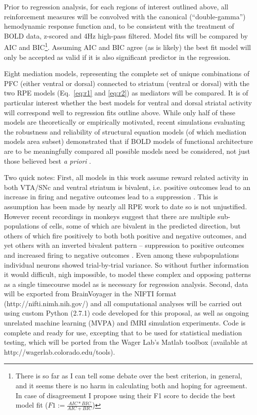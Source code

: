 \documentclass[doc,12pt]{apa}        %
\begin{document}
Prior to regression analysis, for each regions of interest outlined above, all reinforcement measures will be convolved with the canonical (``double-gamma'') hemodynamic response function and, to be consistent with the treatment of BOLD data, z-scored and 4Hz high-pass filtered.  Model fits will be compared by AIC and BIC\footnote{There is so far as I can tell some debate over the best criterion, in general, and it seems there is no harm in calculating both and hoping for agreement.  In case of disagreement I propose using their F1 score to decide the best model fit ($F1 := \frac{AIC*BIC}{AIC+BIC}$) }. Assuming AIC and BIC agree (as is likely) the best fit model will only be accepted as valid if it is also significant predictor in the regression.

Eight mediation models, representing the complete set of unique combinations of PFC (either ventral or dorsal) connected to striatum (ventral or dorsal) with the two RPE models (Eq.~\ref{eq:r1} and \ref{eq:r2}) as mediators will be compared.   It is of particular interest whether the best models for ventral and dorsal striatal activity will correspond well to regression fits outline above. While only half of these models are theoretically or empirically motivated, recent simulations evaluating the robustness and reliability of structural equation models (of which mediation models area subset) demonstrated that if BOLD models of functional architecture are to be meaningfully compared all possible models need be considered, not just those believed best \emph{a priori} \cite{Lohmann:2011p8418}.

Two quick notes: First, all models in this work assume reward related activity in both VTA/SNc and ventral striatum is bivalent, i.e. positive outcomes lead to an increase in firing and negative outcomes lead to a suppression \cite{DArdenne:2008p1505,Cooper:2008p5238,Menon:2007p6529}.  This is assumption has been made by nearly all RPE work to date so is not unjustified.  However recent recordings in monkeys suggest that there are multiple sub-populations of cells, some of which are bivalent in the predicted direction, but others of which fire positively to both both positive and negative outcomes, and yet others with an inverted bivalent pattern -- suppression to positive outcomes and increased firing to negative outcomes \cite{Matsumoto:2009p7219,Levita:2009p7280}.  Even among these subpopulations individual neurons showed trial-by-trial variance.  So without further information it would difficult, nigh impossible, to model these complex and opposing patterns as a single timecourse model as is necessary for regression analysis.  Second, data will be exported from BrainVoyager in the NIFTI format (http://nifti.nimh.nih.gov/) and all computational analyses will be carried out using custom Python (2.7.1) code developed for this proposal, as well as ongoing unrelated machine learning (MVPA) and fMRI simulation experiments.  Code is complete and ready for use, excepting that to be used for statistical mediation testing, which will be ported from the Wager Lab's Matlab toolbox (available at http://wagerlab.colorado.edu/tools).
\end{document}
